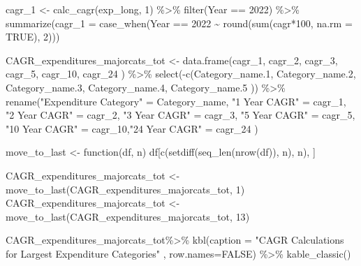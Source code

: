 \documentclass[
  letterpaper,
  DIV=11,
  numbers=noendperiod]{scrreport}
\newenvironment{Shaded}{\begin{snugshade}}{\end{snugshade}}
\newcommand{\AttributeTok}[1]{\textcolor[rgb]{0.40,0.45,0.13}{#1}}
\newcommand{\ConstantTok}[1]{\textcolor[rgb]{0.56,0.35,0.01}{#1}}
\newcommand{\ControlFlowTok}[1]{\textcolor[rgb]{0.00,0.23,0.31}{#1}}
\newcommand{\DecValTok}[1]{\textcolor[rgb]{0.68,0.00,0.00}{#1}}
\newcommand{\FloatTok}[1]{\textcolor[rgb]{0.68,0.00,0.00}{#1}}
\newcommand{\FunctionTok}[1]{\textcolor[rgb]{0.28,0.35,0.67}{#1}}
\newcommand{\NormalTok}[1]{\textcolor[rgb]{0.00,0.23,0.31}{#1}}
\newcommand{\OtherTok}[1]{\textcolor[rgb]{0.00,0.23,0.31}{#1}}
\newcommand{\SpecialCharTok}[1]{\textcolor[rgb]{0.37,0.37,0.37}{#1}}
\newcommand{\StringTok}[1]{\textcolor[rgb]{0.13,0.47,0.30}{#1}}
\begin{document}
\begin{Shaded}
\begin{Highlighting}[]
\NormalTok{cagr\_1 }\OtherTok{\textless{}{-}} \FunctionTok{calc\_cagr}\NormalTok{(exp\_long, }\DecValTok{1}\NormalTok{) }\SpecialCharTok{\%\textgreater{}\%} 
  \FunctionTok{filter}\NormalTok{(Year }\SpecialCharTok{==} \DecValTok{2022}\NormalTok{) }\SpecialCharTok{\%\textgreater{}\%}
  \FunctionTok{summarize}\NormalTok{(}\AttributeTok{cagr\_1 =} \FunctionTok{case\_when}\NormalTok{(Year }\SpecialCharTok{==} \DecValTok{2022} \SpecialCharTok{\textasciitilde{}} \FunctionTok{round}\NormalTok{(}\FunctionTok{sum}\NormalTok{(cagr}\SpecialCharTok{*}\DecValTok{100}\NormalTok{, }\AttributeTok{na.rm =} \ConstantTok{TRUE}\NormalTok{), }\DecValTok{2}\NormalTok{)))}

\NormalTok{CAGR\_expenditures\_majorcats\_tot }\OtherTok{\textless{}{-}} \FunctionTok{data.frame}\NormalTok{(cagr\_1, cagr\_2, cagr\_3, cagr\_5, cagr\_10, cagr\_24 ) }\SpecialCharTok{\%\textgreater{}\%} 
  \FunctionTok{select}\NormalTok{(}\SpecialCharTok{{-}}\FunctionTok{c}\NormalTok{(Category\_name}\FloatTok{.1}\NormalTok{, Category\_name}\FloatTok{.2}\NormalTok{, Category\_name}\FloatTok{.3}\NormalTok{, Category\_name}\FloatTok{.4}\NormalTok{, Category\_name}\FloatTok{.5}\NormalTok{ )) }\SpecialCharTok{\%\textgreater{}\%} 
  \FunctionTok{rename}\NormalTok{(}\StringTok{"Expenditure Category"} \OtherTok{=}\NormalTok{ Category\_name, }\StringTok{"1 Year CAGR"} \OtherTok{=}\NormalTok{ cagr\_1, }\StringTok{"2 Year CAGR"} \OtherTok{=}\NormalTok{ cagr\_2, }\StringTok{"3 Year CAGR"} \OtherTok{=}\NormalTok{ cagr\_3, }\StringTok{"5 Year CAGR"} \OtherTok{=}\NormalTok{ cagr\_5, }\StringTok{"10 Year CAGR"} \OtherTok{=}\NormalTok{ cagr\_10,}\StringTok{"24 Year CAGR"} \OtherTok{=}\NormalTok{ cagr\_24 )}

\NormalTok{move\_to\_last }\OtherTok{\textless{}{-}} \ControlFlowTok{function}\NormalTok{(df, n) df[}\FunctionTok{c}\NormalTok{(}\FunctionTok{setdiff}\NormalTok{(}\FunctionTok{seq\_len}\NormalTok{(}\FunctionTok{nrow}\NormalTok{(df)), n), n), ]}

\NormalTok{CAGR\_expenditures\_majorcats\_tot }\OtherTok{\textless{}{-}} \FunctionTok{move\_to\_last}\NormalTok{(CAGR\_expenditures\_majorcats\_tot, }\DecValTok{1}\NormalTok{)}
\NormalTok{CAGR\_expenditures\_majorcats\_tot }\OtherTok{\textless{}{-}} \FunctionTok{move\_to\_last}\NormalTok{(CAGR\_expenditures\_majorcats\_tot, }\DecValTok{13}\NormalTok{) }


\NormalTok{CAGR\_expenditures\_majorcats\_tot}\SpecialCharTok{\%\textgreater{}\%}   
  \FunctionTok{kbl}\NormalTok{(}\AttributeTok{caption =} \StringTok{"CAGR Calculations for Largest Expenditure Categories"}\NormalTok{ , }\AttributeTok{row.names=}\ConstantTok{FALSE}\NormalTok{) }\SpecialCharTok{\%\textgreater{}\%} 
     \FunctionTok{kable\_classic}\NormalTok{() }
\end{Highlighting}
\end{Shaded}
\end{document}
